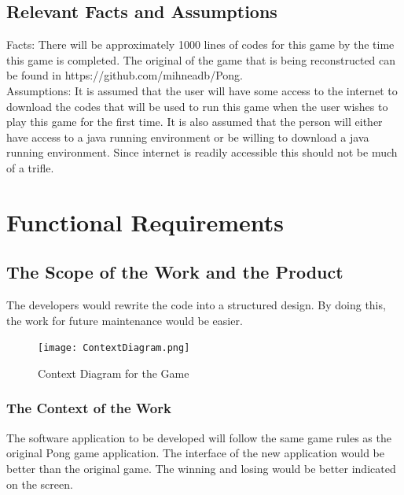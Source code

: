 \documentclass[12pt,letterpaper]{article}
\begin{document}
	\subsection{Relevant Facts and Assumptions}
Facts:
There will be approximately 1000 lines of codes for this game by the time this game is completed. The original of the game that is being reconstructed can be found in https://github.com/mihneadb/Pong.\\  


\noindent Assumptions:
It is assumed that the user will have some access to the internet to download the codes that will be used to run this game when the user wishes to play this game for the first time. It is also assumed that the person will either have access to a java running environment or be willing to download a java running environment. Since internet is readily accessible this should not be much of a trifle.

	
	\section{Functional Requirements}

	\subsection{The Scope of the Work and the Product}
The developers would rewrite the code into a structured design. By doing this, the work for future maintenance would be easier.

\begin{figure}[h]
  \texttt{[image: ContextDiagram.png]}
  \caption{Context Diagram for the Game}
\end{figure}

	\subsubsection{The Context of the Work}
The software application to be developed will follow the same game rules as the original Pong game application. The interface of the new application would be better than the original game. The winning and losing would be better indicated on the screen.
\end{document}
